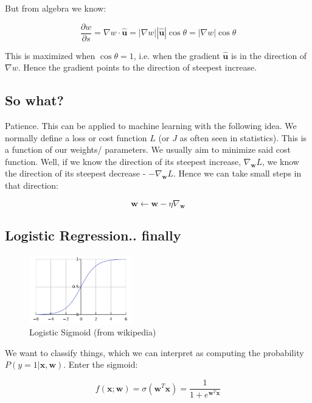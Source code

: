 \documentclass{article}
\newcommand{\vf}[1]{\mathbf{#1}}
\newcommand{\bx}{\vf{x}}
\newcommand{\bw}{\vf{w}}
\begin{document}
But from algebra we know:

\begin{equation*}
    \frac{\partial w}{\partial s} = \nabla w \cdot \hat{\mathbf{u}} = |\nabla w| |\hat{\mathbf{u}}| \cos{\theta} = |\nabla w| \cos{\theta}
\end{equation*}

This is maximized when $\cos{\theta} = 1$, i.e. when the gradient $\hat{\mathbf{u}}$ is in the direction of $\nabla w$. Hence the gradient points to the direction of steepest increase.

\subsection{So what?}
Patience. This can be applied to machine learning with the following idea. We normally define a loss or cost function $L$ (or $J$ as often seen in statistics). This is a function of our weights/ parameters. We usually aim to minimize said cost function. Well, if we know the direction of its steepest increase, $\nabla_{\vf{w}} L$, we know the direction of its steepest decrease - $-\nabla_{\vf{w}} L$. Hence we can take small steps in that direction:

\begin{equation*}
    \vf{w} \leftarrow \vf{w} - \eta \nabla_{\vf{w}}
\end{equation*}

\subsection{Logistic Regression.. finally}
\begin{figure}
    \centering
    \includegraphics[width=0.4\textwidth]{figures/600px-Logistic-curve.png}
    \caption{Logistic Sigmoid (from wikipedia)}
    \label{fig:sigmoid}
\end{figure}

We want to classify things, which we can interpret as computing the probability $P(y = 1 | \bx, \bw)$. Enter the sigmoid:

\begin{equation*}
    f(\vf{x}; \vf{w}) = \sigma(\vf{w}^T \vf{x}) = \frac{1}{1 + e^{\vf{w}^T \vf{x}}}
\end{equation*}
\end{document}
